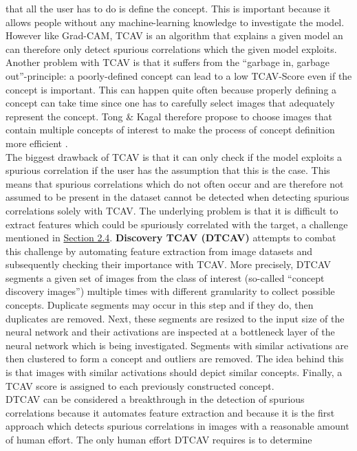 \documentclass{article}
\begin{document}
that all the user has to do is define the concept. This is important because it allows people without any machine-learning
knowledge to investigate the model. \\
However like Grad-CAM, TCAV is an algorithm that explains a given model an can
therefore only detect spurious correlations which the given model exploits. Another problem with TCAV
is that it suffers from the \enquote{garbage in, garbage out}-principle: a poorly-defined concept can lead to a low
TCAV-Score even if the concept is important. This can happen quite often because properly defining a concept can take time
since one has to carefully select images that adequately represent the concept. Tong \& Kagal therefore propose to choose
images that contain multiple concepts of interest to make the process of concept definition
more efficient \cite{tong2020investigating}. \\ 
The biggest drawback of TCAV is that it can only check if the model exploits a spurious correlation if the user has the assumption 
that this is the case. This means that spurious correlations which do not often occur and are therefore not assumed 
to be present in the dataset cannot be detected when detecting spurious correlations solely with TCAV. The underlying problem is
that it is difficult to extract features which could be spuriously correlated with the target, a challenge mentioned in
\hyperref[sec:challenged]{Section 2.4}. \textbf{Discovery TCAV (DTCAV)} \cite{ghorbani2019automating} attempts to combat this challenge by
automating feature extraction from image datasets and subsequently checking their importance with TCAV. More precisely, DTCAV segments a
given set of images from the class of interest (so-called \enquote{concept discovery images}) multiple times with different granularity to
collect possible concepts. Duplicate segments may occur in this step and if they do, then duplicates are removed. Next, these segments are
resized to the input size of the neural network and their activations are inspected at a bottleneck layer of the neural network which is being
investigated. Segments with similar activations are then clustered to form a concept and outliers are removed. The idea behind this is that images
with similar activations should depict similar concepts. Finally, a TCAV score is assigned to each previously constructed concept. \\
DTCAV can be considered a breakthrough in the detection of spurious correlations because it automates feature extraction and because it is the first
approach which detects spurious correlations in images with a reasonable amount of human effort. The only human effort DTCAV requires is to determine
\end{document}
